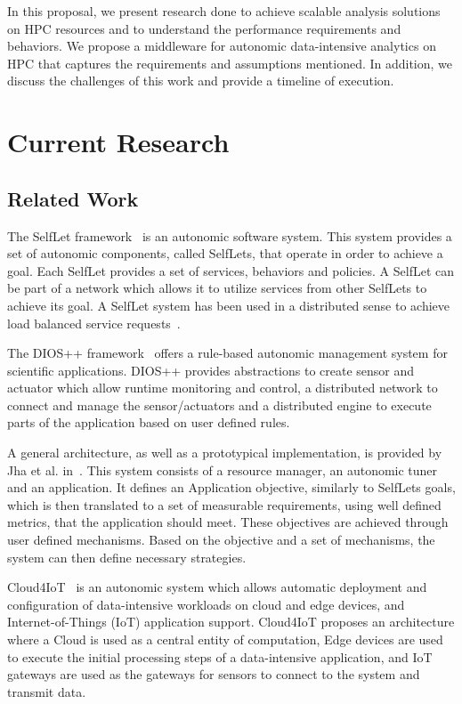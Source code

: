 In this proposal, we present research done to achieve scalable analysis solutions on HPC resources and to understand the performance requirements and behaviors. We propose a middleware for autonomic data-intensive analytics on HPC that captures the requirements and assumptions mentioned. In addition, we discuss the challenges of this work and provide a timeline of execution.

\section{Current Research}

\subsection{Related Work}

The SelfLet framework~\cite{bindelli2008building} is an autonomic software system. This system provides a set of autonomic components, called SelfLets, that operate in order to achieve a goal. Each SelfLet provides a set of services, behaviors and policies. A SelfLet can be part of a network which allows it to utilize services from other SelfLets to achieve its goal. A SelfLet system has been used in a distributed sense to achieve load balanced service requests~\cite{calcavecchia2010emergence}.

The DIOS++ framework~\cite{liu2003dios} offers a rule-based autonomic management system for scientific applications. DIOS++ provides abstractions to create sensor and actuator which allow runtime monitoring and control, a distributed network to connect and manage the sensor/actuators and a distributed engine to execute parts of the application based on user defined rules.

A general architecture, as well as a prototypical implementation, is provided by Jha et al. in~\cite{jha2009self}. This system consists of a resource manager, an autonomic tuner and an application. It defines an Application objective, similarly to SelfLets goals, which is then translated to a set of measurable requirements, using well defined metrics, that the application should meet. These objectives are achieved through user defined mechanisms. Based on the objective and a set of mechanisms, the system can then define necessary strategies.

Cloud4IoT~\cite{pizzolli2016cloud4iot} is an autonomic system which allows automatic deployment and configuration of data-intensive workloads on cloud and edge devices, and Internet-of-Things (IoT) application support. Cloud4IoT proposes an architecture where a Cloud is used as a central entity of computation, Edge devices are used to execute the initial processing steps of a data-intensive application, and IoT gateways are used as the gateways for sensors to connect to the system and transmit data.

